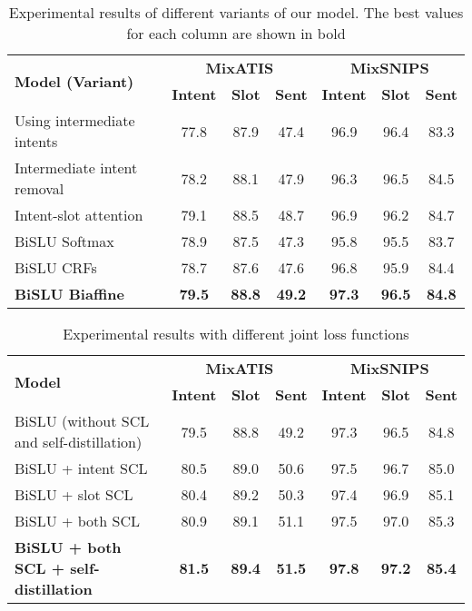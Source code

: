 \documentclass{ecai}
\begin{document}
\begin{table*}[t]
\centering
\caption{Experimental results of different variants of our model. The best values for each column are shown in bold}
\begin{tabular}{|l|c|c|c|c|c|c|}
\hline
\multirow{2}{*}{\textbf{Model (Variant)}} & \multicolumn{3}{|c|}{\textbf{MixATIS}} &	\multicolumn{3}{|c|}{\textbf{MixSNIPS}} \\
\cline{2-7}
& \textbf{Intent} &	\textbf{Slot} & \textbf{Sent}  &	 \textbf{Intent} &	\textbf{Slot} &	\textbf{Sent} \\
	\hline
	\hline
 Using intermediate intents	&77.8 & 87.9 &	47.4 &	96.9	 & 96.4	 &	83.3\\
 \hline
Intermediate intent removal & 78.2  &	88.1  &	47.9 & 96.3	 &	96.5 & 84.5\\
\hline
Intent-slot attention & 79.1 &	88.5 &	48.7 &	96.9 & 96.2 & 84.7 \\
\hline
BiSLU Softmax &  78.9 &	87.5 &	47.3 &	95.8 &	95.5 & 83.7\\
\hline
BiSLU CRFs & 78.7 &	87.6 &	47.6 &	96.8 &	95.9 &	84.4 \\
\hline
\hline
\textbf{BiSLU Biaffine} & \textbf{79.5}	& 	\textbf{88.8}	& 	\textbf{49.2}	& 	\textbf{97.3}	& 	\textbf{96.5}	& 	\textbf{84.8} \\
\hline
\end{tabular}
\label{tab:Ablation}
\end{table*}

\begin{table*}[t]
\centering
\caption{Experimental results with different joint loss functions}
\label{tab:loss}
\begin{tabular}{|l|c|c|c|c|c|c|}
\hline
\multirow{2}{*}{\textbf{Model}} & \multicolumn{3}{|c|}{\textbf{MixATIS}} &	\multicolumn{3}{|c|}{\textbf{MixSNIPS}} \\
\cline{2-7}
& \textbf{Intent} &	\textbf{Slot} &	\textbf{Sent} & \textbf{Intent} &	\textbf{Slot} &	\textbf{Sent} \\
	\hline
	\hline
BiSLU (without SCL and self-distillation)	& 79.5	& 	88.8	& 	49.2	& 	97.3	& 	96.5	& 	84.8 \\
\hline
\hline
BiSLU  + intent SCL &	80.5 &	89.0 &	50.6 &	97.5 &	96.7 &	85.0 \\
\hline
BiSLU  + slot SCL &	80.4 &	89.2 &	50.3 &	97.4 &	 96.9 &	85.1 \\
\hline
BiSLU  + both SCL &	80.9 &	89.1 &	51.1 &	97.5 &	97.0 &	85.3 \\
\hline
\hline
\textbf{BiSLU + both SCL + self-distillation} &\textbf{81.5} &	\textbf{89.4} &	\textbf{51.5} & \textbf{97.8} & \textbf{97.2} & \textbf{85.4}\\
\hline
\end{tabular}
\end{table*}
\end{document}
